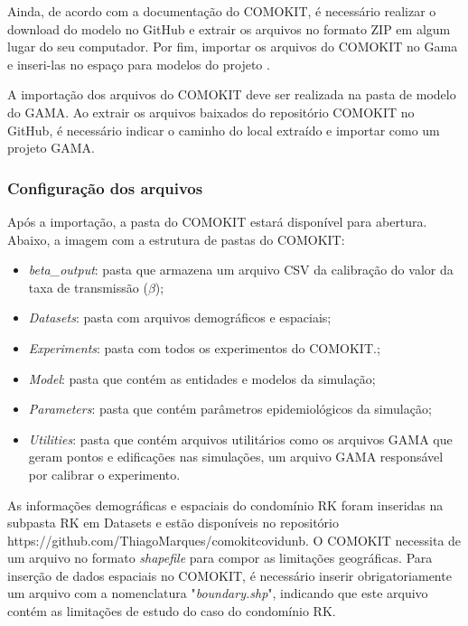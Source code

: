Ainda, de acordo com a documentação do COMOKIT, é necessário realizar o download do modelo no GitHub e extrair os arquivos no formato ZIP em algum lugar do seu computador. Por fim, importar os arquivos do COMOKIT no Gama e inseri-las no espaço para modelos do projeto \cite{ComokitDoc}.



A importação dos arquivos do COMOKIT deve ser realizada na pasta de modelo do GAMA. Ao extrair os arquivos baixados do repositório COMOKIT no GitHub, é necessário indicar o caminho do local extraído e importar como um projeto GAMA.

\subsubsection{Configuração dos arquivos}

Após a importação, a pasta do COMOKIT estará disponível para abertura. Abaixo, a imagem com a estrutura de pastas do COMOKIT:

\begin{itemize}
\item \textit{beta\_output}: pasta que armazena um arquivo CSV da calibração do valor da taxa de transmissão ($\beta$);
\item \textit{Datasets}: pasta com arquivos demográficos e espaciais;
\item \textit{Experiments}: pasta com todos os experimentos do COMOKIT.;
\item \textit{Model}: pasta que contém as entidades e modelos da simulação;
\item \textit{Parameters}: pasta que contém parâmetros epidemiológicos da simulação;
\item \textit{Utilities}: pasta que contém arquivos utilitários como os arquivos GAMA que geram pontos e edificações nas simulações, um arquivo GAMA responsável por calibrar o experimento.
\end{itemize}

As informações demográficas e espaciais do condomínio RK foram inseridas na subpasta RK em Datasets e estão disponíveis no repositório https://github.com/ThiagoMarques/comokitcovidunb. O COMOKIT necessita de um arquivo no formato \textit{shapefile} para compor as limitações geográficas. Para inserção de dados espaciais no COMOKIT, é necessário inserir obrigatoriamente um arquivo com a nomenclatura "\textit{boundary.shp}", indicando que este arquivo contém as limitações de estudo do caso do condomínio RK.

